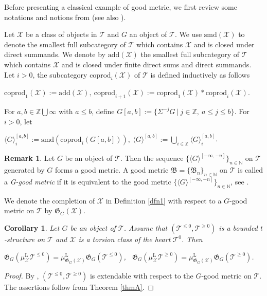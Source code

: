 \documentclass[11pt,a4paper]{amsart}
\numberwithin{equation}{section} \theoremstyle{plain}
\newtheorem{cor}[lem]{Corollary}
\numberwithin{equation}{section} \theoremstyle{definition}
\newtheorem{rem}[lem]{Remark}
\newenvironment{rmk}{\begin{rem}\rm}{\end{rem}}
\begin{document}
Before presenting a classical example of good metric, we first review some notations and notions from \cite[Reminders 1.1 and 0.1; Definition 1.3]{N3} (see also \cite[Subsection 2.2]{BV}).

Let $\mathcal{X}$ be a class of objects in $\mathcal{T}$ and $G$ an object of $\mathcal{T}$. We use $\mathrm{smd}(\mathcal{X})$ to denote the smallest full subcategory of $\mathcal{T}$ which contains $\mathcal{X}$ and is closed under direct summands. We denote by $\mathrm{add}(\mathcal{X})$ the smallest full subcategory of $\mathcal{T}$ which contains $\mathcal{X}$ and is closed under finite direct sums and direct summands. Let $i>0$, the subcategory $\mathrm{coprod}_{i}(\mathcal{X})$ of $\mathcal{T}$ is defined inductively as follows
\begin{center}
$\mathrm{coprod}_{1}(\mathcal{X}):=\mathrm{add}(\mathcal{X}),~\mathrm{coprod}_{i+1}(\mathcal{X}):=
\mathrm{coprod}_{1}(\mathcal{X})\ast\mathrm{coprod}_{i}(\mathcal{X})$.
\end{center}
For $a,b\in\mathbb{Z}\bigcup\infty$ with $a\leq b$, define $G[a,b]:=\{\Sigma^{-j}G~|~j\in\mathbb{Z},~a\leq j\leq b\}$. For $i>0$, let
\begin{center}
$\langle G\rangle_{i}^{[a,b]}:=\mathrm{smd}(\mathrm{coprod}_{i}(G[a,b])),~\langle G\rangle^{[a,b]}:=\bigcup\limits_{i\in\mathbb{Z}}\langle G\rangle_{i}^{[a,b]}$.
\end{center}


\begin{rmk}\label{exa1} Let $G$ be an object of $\mathcal{T}$. Then the sequence $\{\langle G\rangle^{[-\infty,-n]}\}_{n\in\mathbb{N}}$ on $\mathcal{T}$ generated by $G$ forms a good metric. A good metric $\mathfrak{B}=\{\mathfrak{B}_{n}\}_{n\in\mathbb{N}}$ on $\mathcal{T}$ is called a  \emph{G-good metric} if it is equivalent to the good metric $\{\langle G\rangle^{[-\infty,-n]}\}_{n\in\mathbb{N}}$, see \cite[Definition 1.4]{BCRPZ}.
\end{rmk}

We denote the completion of $\mathcal{X}$ in Definition \ref{dfn1} with respect to a $G$-good metric on $\mathcal{T}$ by $\mathfrak{G}_{G}(\mathcal{X})$.

\begin{cor}\label{cor1} Let $G$ be an object of $\mathcal{T}$. Assume that $(\mathcal{T}^{\leq0},\mathcal{T}^{\geq0})$ is a bounded $t$-structure on $\mathcal{T}$ and $\mathcal{X}$ is a torsion class of the heart $\mathcal{T}^{0}$. Then
\begin{center} $\mathfrak{G}_{G}(\mu^{\mathrm{L}}_{\mathcal{X}}\mathcal{T}^{\leq0})=\mu^{\mathrm{L}}_{\mathfrak{G}_{G}(\mathcal{X})}\mathfrak{G}_{G}(\mathcal{T}^{\leq0})$,~
$\mathfrak{G}_{G}(\mu^{\mathrm{L}}_{\mathcal{X}}\mathcal{T}^{\geq0})=\mu^{\mathrm{L}}_{\mathfrak{G}_{G}(\mathcal{X})}\mathfrak{G}_{G}(\mathcal{T}^{\geq0})$.
\end{center}
\end{cor}
\begin{proof} By \cite[Lemma 3.3]{BCRPZ}, $(\mathcal{T}^{\leq0},\mathcal{T}^{\geq0})$ is extendable with respect to the $G$-good metric on $\mathcal{T}$. The assertions follow from Theorem \ref{thmA}.
\end{proof}
\end{document}
